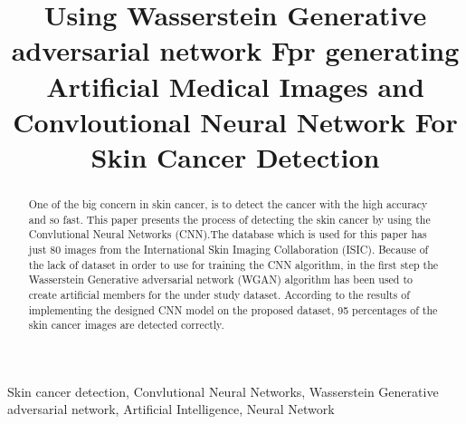 \documentclass[conference]{IEEEtran}
\begin{document}
\title{Using Wasserstein Generative adversarial network Fpr generating Artificial Medical Images and Convloutional Neural Network For Skin Cancer Detection}

\author{
\and
{}
\and

}

\maketitle

\begin{abstract}
One of the big concern in skin cancer, is to detect the cancer with the high accuracy and so fast. This paper presents the process of detecting the skin cancer by using the Convlutional Neural Networks (CNN).The database which is used for this paper has just 80 images from
the International Skin Imaging Collaboration (ISIC). Because of the lack of dataset in order to use for training the CNN algorithm, in the first step the Wasserstein Generative adversarial network (WGAN) algorithm has been used to create artificial members for the under study dataset. According to the results of implementing the designed CNN model on the proposed dataset, 95 percentages of the skin cancer images are detected correctly. \\
\end{abstract}

\begin{IEEEkeywords}
Skin cancer detection, Convlutional Neural Networks, Wasserstein Generative adversarial network, Artificial Intelligence, Neural Network
\end{IEEEkeywords}
\end{document}
